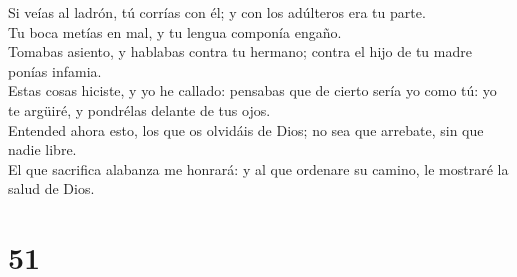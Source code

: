  Si veías al ladrón, tú corrías con él; y con los adúlteros
era tu parte.\\
 Tu boca metías en mal, y tu lengua componía engaño.\\
 Tomabas asiento, y hablabas contra tu hermano; contra el
hijo de tu madre ponías infamia.\\
 Estas cosas hiciste, y yo he callado: pensabas que de
cierto sería yo como tú: yo te argüiré, y pondrélas delante de tus
ojos.\\
 Entended ahora esto, los que os olvidáis de Dios; no sea
que arrebate, sin que nadie libre.\\
 El que sacrifica alabanza me honrará: y al que ordenare su
camino, le mostraré la salud de Dios.

\hypertarget{section-50}{%
\section{51}\label{section-50}}

